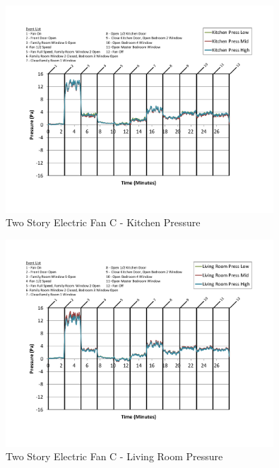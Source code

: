 \documentclass{article}
\begin{document}
\begin{appendices}
	\begin{figure}[H]
		\centering
		\includegraphics[height=3.05in,trim=0.67in 1.1in 0.67in 0.8in,clip=true]{0_Images/Results_Charts/ColdFlow/Two_Story/Electric/C/Kitchen_Pressure.pdf}
		\caption{Two Story Electric Fan C - Kitchen Pressure}
	\end{figure}
 

	\begin{figure}[H]
		\centering
		\includegraphics[height=3.05in,trim=0.67in 1.1in 0.67in 0.8in,clip=true]{0_Images/Results_Charts/ColdFlow/Two_Story/Electric/C/Living_Room_Pressure.pdf}
		\caption{Two Story Electric Fan C - Living Room Pressure}
	\end{figure}
 
	\clearpage


\end{appendices}
\end{document}
